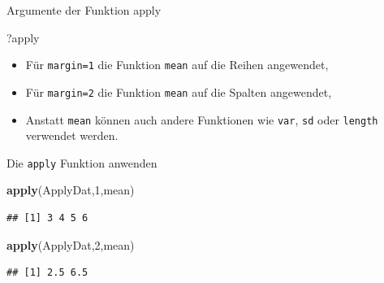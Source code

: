 \documentclass[ignorenonframetext,]{beamer}
\newenvironment{Shaded}{}{}
\newcommand{\KeywordTok}[1]{\textcolor[rgb]{0.00,0.44,0.13}{\textbf{{#1}}}}
\newcommand{\DecValTok}[1]{\textcolor[rgb]{0.25,0.63,0.44}{{#1}}}
\newcommand{\NormalTok}[1]{{#1}}
\begin{document}
\begin{frame}[fragile]{Argumente der Funktion apply}

\begin{Shaded}
\begin{Highlighting}[]
\NormalTok{?apply}
\end{Highlighting}
\end{Shaded}

\begin{itemize}
\item
  Für \texttt{margin=1} die Funktion \texttt{mean} auf die Reihen
  angewendet,
\item
  Für \texttt{margin=2} die Funktion \texttt{mean} auf die Spalten
  angewendet,
\item
  Anstatt \texttt{mean} können auch andere Funktionen wie \texttt{var},
  \texttt{sd} oder \texttt{length} verwendet werden.
\end{itemize}

\end{frame}

\begin{frame}[fragile]{Die \texttt{apply} Funktion anwenden}

\begin{Shaded}
\begin{Highlighting}[]
\KeywordTok{apply}\NormalTok{(ApplyDat,}\DecValTok{1}\NormalTok{,mean)}
\end{Highlighting}
\end{Shaded}

\begin{verbatim}
## [1] 3 4 5 6
\end{verbatim}

\begin{Shaded}
\begin{Highlighting}[]
\KeywordTok{apply}\NormalTok{(ApplyDat,}\DecValTok{2}\NormalTok{,mean)}
\end{Highlighting}
\end{Shaded}

\begin{verbatim}
## [1] 2.5 6.5
\end{verbatim}

\end{frame}
\end{document}
